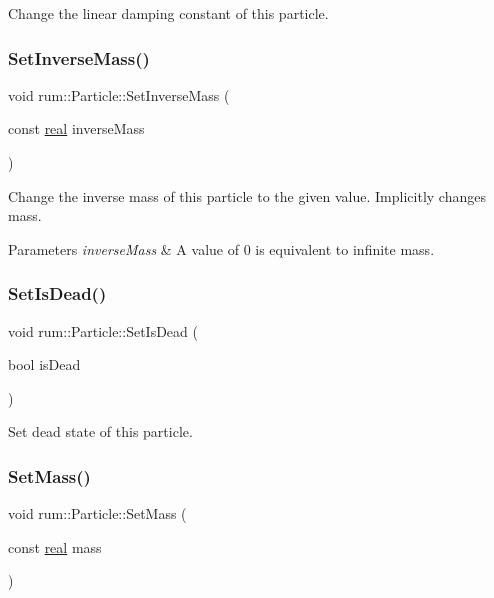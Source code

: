 Change the linear damping constant of this particle. \mbox{\label{classrum_1_1_particle_a2233ab971870fc1cf2337f01cdcae4fb}} 
\subsubsection{\texorpdfstring{Set\+Inverse\+Mass()}{SetInverseMass()}}
{\footnotesize\ttfamily void rum\+::\+Particle\+::\+Set\+Inverse\+Mass (\begin{DoxyParamCaption}\item[{const \hyperlink{namespacerum_a7e8cca23573d5eaead0f138cbaa4862c}{real}}]{inverse\+Mass }\end{DoxyParamCaption})}

Change the inverse mass of this particle to the given value. Implicitly changes mass. 
\begin{DoxyParams}{Parameters}
{\em inverse\+Mass} & A value of 0 is equivalent to infinite mass. \\
\hline
\end{DoxyParams}
\mbox{\label{classrum_1_1_particle_acd315e7907736b20493e091651cff616}} 
\subsubsection{\texorpdfstring{Set\+Is\+Dead()}{SetIsDead()}}
{\footnotesize\ttfamily void rum\+::\+Particle\+::\+Set\+Is\+Dead (\begin{DoxyParamCaption}\item[{bool}]{is\+Dead }\end{DoxyParamCaption})}

Set dead state of this particle. \mbox{\label{classrum_1_1_particle_a6525cbbbf7709bdacb7cb431d3622661}} 
\subsubsection{\texorpdfstring{Set\+Mass()}{SetMass()}}
{\footnotesize\ttfamily void rum\+::\+Particle\+::\+Set\+Mass (\begin{DoxyParamCaption}\item[{const \hyperlink{namespacerum_a7e8cca23573d5eaead0f138cbaa4862c}{real}}]{mass }\end{DoxyParamCaption})}

